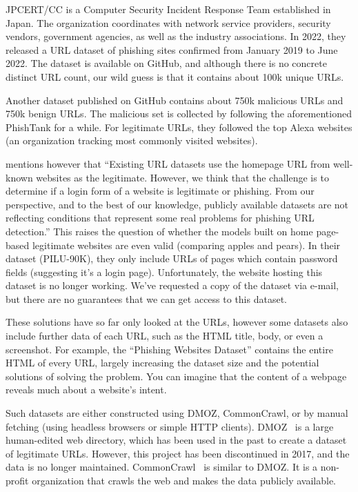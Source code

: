 \documentclass{article}
\begin{document}
    JPCERT/CC is a Computer Security Incident Response Team established in Japan.
    The organization coordinates with network service providers, security vendors, government agencies, as well as the industry associations\cite{JPCertCC}.
    In 2022, they released a URL dataset of phishing sites confirmed from January 2019 to June 2022\cite{JPCertCCDataset}.
    The dataset is available on GitHub, and although there is no concrete distinct URL count, our wild guess is that it contains about 100k unique URLs.

    Another dataset published on GitHub contains about 750k malicious URLs and 750k benign URLs\cite{VisualizingRNNInURLDetection}.
    The malicious set is collected by following the aforementioned PhishTank for a while.
    For legitimate URLs, they followed the top Alexa websites (an organization tracking most commonly visited websites).

    \cite{PhishingLoginURLDetection} mentions however that ``Existing URL datasets use the homepage URL from well-known websites as the legitimate.
    However, we think that the challenge is to determine if a login form of a website is legitimate or phishing.
    From our perspective, and to the best of our knowledge, publicly available datasets are not reflecting conditions that represent some real problems for phishing URL detection.''
    This raises the question of whether the models built on home page-based legitimate websites are even valid (comparing apples and pears).
    In their dataset (PILU-90K), they only include URLs of pages which contain password fields (suggesting it's a login page).
    Unfortunately, the website hosting this dataset is no longer working.
    We've requested a copy of the dataset via e-mail, but there are no guarantees that we can get access to this dataset.

    These solutions have so far only looked at the URLs, however some datasets also include further data of each URL, such as the HTML title, body, or even a screenshot.
    For example, the ``Phishing Websites Dataset''\cite{VisualizingRNNInURLDetection} contains the entire HTML of every URL, largely increasing the dataset size and the potential solutions of solving the problem.
    You can imagine that the content of a webpage reveals much about a website's intent.

    Such datasets are either constructed using DMOZ, CommonCrawl, or by manual fetching (using headless browsers\cite{PhishingLoginURLDetection} or simple HTTP clients).%
    DMOZ~\cite{DMOZ} is a large human-edited web directory, which has been used in the past to create a dataset of legitimate URLs. However, this project has been discontinued in 2017, and the data is no longer maintained.
    CommonCrawl~\cite{CommonCrawl} is similar to DMOZ. It is a non-profit organization that crawls the web and makes the data publicly available.
\end{document}
